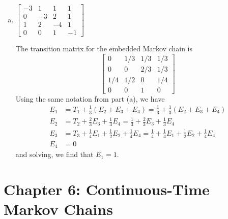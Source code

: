\documentclass{article}
\begin{document}
\begin{itemize}
\begin{enumerate}[(a)]
			\item $\begin{bmatrix}
					-3 & 1 & 1 & 1 \\
					0 & -3 & 2 & 1 \\
					1 & 2 & -4 & 1 \\
					0 & 0 & 1 & -1
				\end{bmatrix}$
				\begin{soln}
					The transition matrix for the embedded Markov chain is
					\[\begin{bmatrix}
							0 & 1/3 & 1/3 & 1/3 \\
							0 & 0 & 2/3 & 1/3 \\
							1/4 & 1/2 & 0 & 1/4 \\
							0 & 0 & 1 & 0
					\end{bmatrix}\]
					Using the same notation from part (a), we have
					\begin{align*}
						E_1 &= T_1 + \frac{1}{3}(E_2+E_3+E_4) = \frac{1}{3} + \frac{1}{3}(E_2+E_3+E_4) \\
						E_2 &= T_2 + \frac{2}{3} E_3 + \frac{1}{3} E_4 = \frac{1}{3} + \frac{2}{3} E_3 + \frac{1}{3} E_4 \\
						E_3 &= T_3 + \frac{1}{4} E_1 + \frac{1}{2}E_2 + \frac{1}{4} E_4 = \frac{1}{4} + \frac{1}{4} E_1 + \frac{1}{2} E_2 + \frac{1}{4} E_4 \\
						E_4 & = 0
					\end{align*}
					and solving, we find that $E_1=1.$
				\end{soln}
				
		\end{enumerate}

\end{itemize}

\section*{Chapter 6: Continuous-Time Markov Chains}
\end{document}

